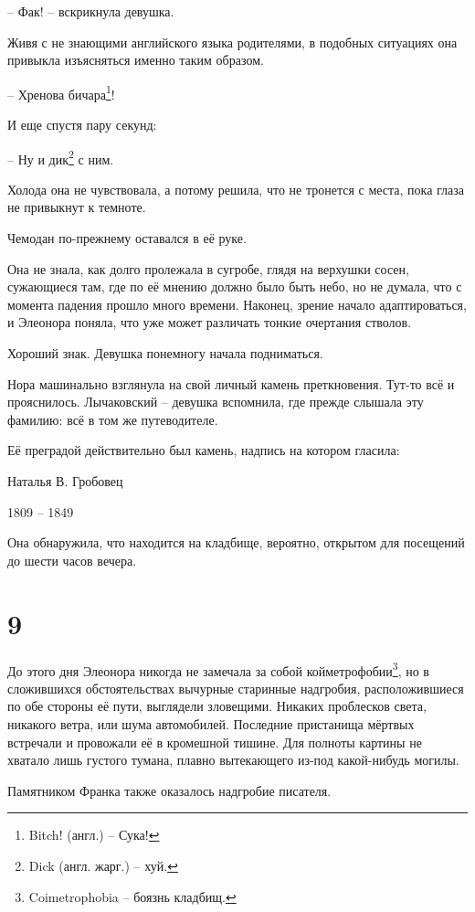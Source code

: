\documentclass[
  a5paperpaper,
  DIV=11,
  numbers=noendperiod]{scrreprt}
\begin{document}
-- Фак! -- вскрикнула девушка.

Живя с не знающими английского языка родителями, в подобных ситуациях
она привыкла изъясняться именно таким образом.

-- Хренова бичара\footnote{Bitch! (англ.) -- Сука!}!

И еще спустя пару секунд:

-- Ну и дик\footnote{Dick (англ. жарг.) -- хуй.} с ним.

Холода она не чувствовала, а потому решила, что не тронется с места,
пока глаза не привыкнут к темноте.

Чемодан по-прежнему оставался в её руке.

Она не знала, как долго пролежала в сугробе, глядя на верхушки сосен,
сужающиеся там, где по её мнению должно было быть небо, но не думала,
что с момента падения прошло много времени. Наконец, зрение начало
адаптироваться, и Элеонора поняла, что уже может различать тонкие
очертания стволов.

Хороший знак. Девушка понемногу начала подниматься.

Нора машинально взглянула на свой личный камень преткновения. Тут-то всё
и прояснилось. Лычаковский -- девушка вспомнила, где прежде слышала эту
фамилию: всё в том же путеводителе.

Её преградой действительно был камень, надпись на котором гласила:

Наталья В. Гробовец

1809 -- 1849

Она обнаружила, что находится на кладбище, вероятно, открытом для
посещений до шести часов вечера.

\section*{9}\label{9}


До этого дня Элеонора никогда не замечала за собой
койметрофобии\footnote{Coimetrophobia -- боязнь кладбищ.}, но в
сложившихся обстоятельствах вычурные старинные надгробия,
расположившиеся по обе стороны её пути, выглядели зловещими. Никаких
проблесков света, никакого ветра, или шума автомобилей. Последние
пристанища мёртвых встречали и провожали её в кромешной тишине. Для
полноты картины не хватало лишь густого тумана, плавно вытекающего
из-под какой-нибудь могилы.

Памятником Франка также оказалось надгробие писателя.
\end{document}
